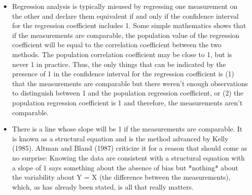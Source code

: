 \begin{itemize}
\item Regression analysis is typically misused by regressing one measurement on the other and declare them equivalent if and only if the confidence interval for the regression coefficient includes 1. Some simple mathematics shows that if the measurements are comparable, the population value of the regression coefficient will be equal to the correlation coefficient between the two methods. 
The population correlation coefficient may be close to 1, but is never 1 in practice. Thus, the only things that can be indicated by the presence of 1 in the confidence interval for the regression coefficient is (1) that the measurements are comparable but there weren't enough observations to distinguish between 1 and the population regression coefficient, or (2) the population regression coefficient is 1 and therefore, the measurements aren't comparable.

\item There is a line whose slope will be 1 if the measurements are comparable. It is known as a structural equation and is the method advanced by Kelly (1985). Altman and Bland (1987) criticize it for a reason that should come as no surprise: Knowing the data are consistent with a structural equation with a slope of 1 says something about the absence of bias but *nothing* about the variability about Y = X (the difference between the measurements), which, as has already been stated, is all that really matters.
\end{itemize}
